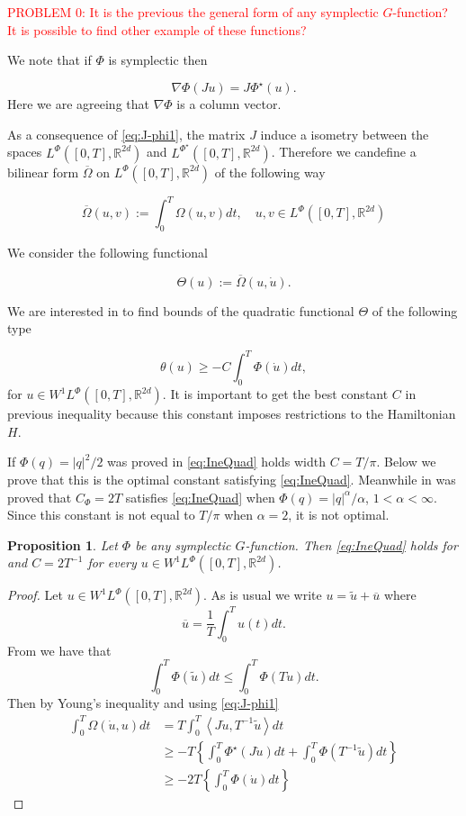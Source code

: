 \documentclass[twoside]{article}
\newtheorem{prop}[thm]{Proposition}
\theoremstyle{remark}
\newcounter{example}[section]
\newcommand{\rr}{\mathbb{R}}
\renewcommand{\leq}{\leqslant}
\renewcommand{\geq}{\geqslant}
\newcommand{\Phie}{\Phi^{\star}}
\begin{document}
\textcolor{red}{PROBLEM 0: It is the previous the general form of any symplectic $G$-function? It is possible to find other example of these functions?}

We note that if $\Phi$ is symplectic then

\begin{equation}\label{eq:J-phi2}
 \nabla\Phi(Ju)= J\Phie(u).
\end{equation}
Here we are agreeing that $\nabla\Phi$ is a column vector.

As a consequence of \eqref{eq:J-phi1}, the matrix $J$ induce a isometry  between the spaces $L^{\Phi}([0,T],\rr^{2d})$ and $L^{\Phie}([0,T],\rr^{2d})$.  Therefore we candefine  a bilinear form $\overline{\Omega}$  on $L^{\Phi}([0,T],\rr^{2d})$ of the following way

\[\overline{\Omega}(u,v):=\int_0^T\Omega(u, v) dt,\quad u,v\in L^{\Phi}([0,T],\rr^{2d})\]

We consider the following functional

\[\Theta(u):=\overline{\Omega}(u,\dot{u}).\]

We are interested in to find bounds of the quadratic functional $\Theta$ of the following type

\begin{equation}\label{eq:IneQuad}
 \theta(u)\geq -C\int_0^T\Phi\left(\dot{u}\right)dt,
\end{equation}
for $u\in W^1L^{\Phi}([0,T],\rr^{2d})$. It is important to get the best constant $C$ in previous inequality because this constant imposes  restrictions to the Hamiltonian $H$. 

If $\Phi(q)=|q|^2/2$ was proved in \cite[Prop. 3.2]{mawhin2010critical} \eqref{eq:IneQuad} holds width $C=T/\pi$.  Below we prove that this is the optimal constant satisfying \eqref{eq:IneQuad}.   Meanwhile in \cite[Lem. 3.3]{Tian2007192} 
was proved that $C_{\Phi}=2T$ satisfies \eqref{eq:IneQuad} when $\Phi(q)=|q|^{\alpha}/\alpha$, $1<\alpha<\infty$. Since this constant is not equal to $T/\pi$ when $\alpha=2$, it is not optimal.

\begin{prop}
 Let $\Phi$ be any symplectic $G$-function. Then  \eqref{eq:IneQuad} holds for  and $C=2T^{-1}$ for every  $u\in W^1L^{\Phi}([0,T],\rr^{2d})$.
\end{prop}

 \begin{proof} Let  $u\in W^1L^{\Phi}([0,T],\rr^{2d})$. As is usual we write $u=\tilde{u}+\overline{u}$ where
 \[\overline{u}=\frac{1}{T}\int_0^Tu(t)dt.\]
 From \cite[Lem. 2.4]{MA2017} we have that
 \[\int_0^T\Phi(\tilde{u})dt\leq\int_0^T\Phi(T\dot{u})dt.\]
 Then by Young's inequality and using \eqref{eq:J-phi1}
 \[
 \begin{split}
  \int_0^T\Omega\left(\dot{u},u\right)dt &=T\int_0^T\left\langle J\dot{u},T^{-1}\tilde{u}\right\rangle dt\\
  &\geq -T\left\{ \int_0^T\Phie(J\dot{u})dt + \int_0^T\Phi(T^{-1}\tilde{u})dt \right\}\\
  &\geq -2T\left\{ \int_0^T\Phi(\dot{u})dt \right\}
  \end{split}
 \]
 \end{proof}
\end{document}
